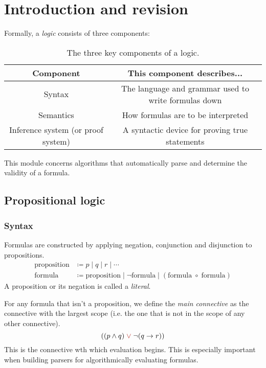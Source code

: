 \section{Introduction and revision}

Formally, a \emph{logic} consists of three components:

\begin{table}[H]
    \centering
    \begin{tabular}{|c|c|}
        \hline
        \textbf{Component} & \textbf{This component describes...}\\
        \hline
        Syntax & The language and grammar used to write formulas down\\
        \hline
        Semantics & How formulas are to be interpreted\\
        \hline
        Inference system (or proof system) & A syntactic device for proving true statements\\
        \hline
    \end{tabular}

    \caption{The three key components of a logic.}
    \label{tab:Ch01-components-of-a-logic}
\end{table}

This module concerns algorithms that automatically parse and determine the validity of a formula.


\subsection{Propositional logic}

\subsubsection{Syntax}

Formulas are constructed by applying negation, conjunction and disjunction to propositions. 
%
\begin{align*}
    \text{proposition} &\coloneq p \;\vert\; q \;\vert\; r \;\vert\; \cdots\\
    \text{formula} &\coloneq \text{proposition} \;\vert\; \neg \text{formula} \;\vert\; (\text{formula} \;\circ\; \text{formula})  \tag{where \(\circ\) is \(\land\), \(\lor\) or \(\rightarrow\)}
\end{align*}
%
A proposition or its negation is called a \emph{literal}.

For any formula that isn't a proposition, we define the \emph{main connective} as the connective with the largest scope (i.e. the one that is not in the scope of any other connective).
%
\[((p \land q) \;{\color{BrickRed} \lor}\; \neg (q \rightarrow r))\]
%
This is the connective wth which evaluation begins. This is especially important when building parsers for algorithmically evaluating formulas.


